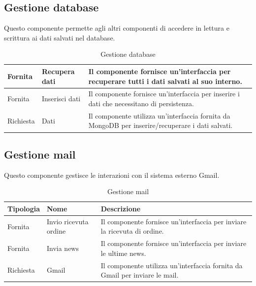 \subsection{Gestione database}
Questo componente permette agli altri componenti di accedere in lettura e scrittura ai dati salvati nel database.


\begin{table}[htbp!]
    \centering
    \begin{tabularx}{0.9\textwidth}{ >{\centering\arraybackslash}X | >{\centering\arraybackslash}X | m{8cm}}
        \hline
        Fornita &  Recupera dati & Il componente fornisce un'interfaccia per recuperare tutti i dati salvati al suo interno.\\
        \hline
        Fornita &  Inserisci dati & Il componente fornisce un'interfaccia per inserire i dati che necessitano di persistenza.\\
        \hline
        Richiesta &  Dati & Il componente utilizza un'interfaccia fornita da MongoDB per inserire/recuperare i dati salvati.\\
        \hline
    \end{tabularx}
    \caption{Gestione database}
    \label{tab:gestione-database}
\end{table}


\subsection{Gestione mail}
Questo componente gestisce le interazioni con il sistema esterno Gmail.

\begin{table}[htbp!]
    \centering
    \begin{tabularx}{0.9\textwidth}{ >{\centering\arraybackslash}X | >{\centering\arraybackslash}X | m{8cm}}
        \hline
        \textbf{Tipologia} & \textbf{Nome}  & \textbf{Descrizione}\\
        \hline
        Fornita & Invio ricevuta ordine & Il componente fornisce un'interfaccia per inviare la ricevuta di ordine.\\
        \hline
        Fornita & Invia news & Il componente fornisce un'interfaccia per inviare le ultime news.\\
        \hline
        Richiesta &  Gmail & Il componente utilizza un'interfaccia fornita da Gmail per inviare le mail.\\
        \hline
    \end{tabularx}
    \caption{Gestione mail}
    \label{tab:gestione-mail}
\end{table}

